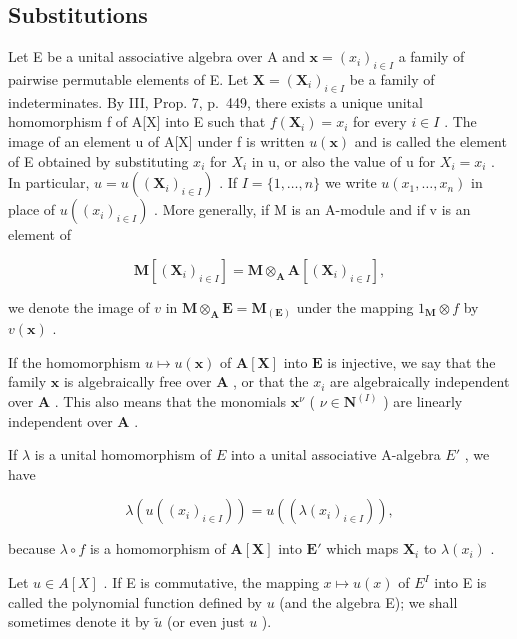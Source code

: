 \subsection{Substitutions}

Let E be a unital associative algebra over A and \(\mathbf{x} = (x_{i})_{i \in I}\) a family of pairwise permutable elements of E. Let \(\mathbf{X} = (\mathbf{X}_{i})_{i \in I}\) be a family of indeterminates. By III, Prop. 7, p.~449, there exists a unique unital homomorphism f of A{[}X{]} into E such that \(f(\mathbf{X}_{i}) = x_{i}\) for every \(i \in I\) . The image of an element u of A{[}X{]} under f is written \(u(\mathbf{x})\) and is called the element of E obtained by substituting \(x_{i}\) for \(X_{i}\) in u, or also the value of u for \(X_{i} = x_{i}\) . In particular, \(u = u((\mathbf{X}_{i})_{i \in I})\) . If \(I = \{1, \ldots, n\}\) we write \(u(x_{1}, \ldots, x_{n})\) in place of \(u((x_{i})_{i \in I})\) . More generally, if M is an A-module and if v is an element of

\[
\mathbf {M} [ (\mathbf {X} _ {i}) _ {i \in I} ] = \mathbf {M} \otimes_ {\mathbf {A}} \mathbf {A} [ (\mathbf {X} _ {i}) _ {i \in I} ],
\]

we denote the image of \(v\) in \(\mathbf{M} \otimes_{\mathbf{A}} \mathbf{E} = \mathbf{M}_{(\mathbf{E})}\) under the mapping \(1_{\mathbf{M}} \otimes f\) by \(v(\mathbf{x})\) .

If the homomorphism \(u \mapsto u(\mathbf{x})\) of \(\mathbf{A}[\mathbf{X}]\) into \(\mathbf{E}\) is injective, we say that the family \(\mathbf{x}\) is algebraically free over \(\mathbf{A}\) , or that the \(x_i\) are algebraically independent over \(\mathbf{A}\) . This also means that the monomials \(\mathbf{x}^\nu\) ( \(\nu \in \mathbf{N}^{(I)}\) ) are linearly independent over \(\mathbf{A}\) .

If \(\lambda\) is a unital homomorphism of \(E\) into a unital associative A-algebra \(E'\) , we have

\[
\lambda \left(u \left(\left(x _ {i}\right) _ {i \in I}\right)\right) = u \left(\left(\lambda \left(x _ {i}\right) _ {i \in I}\right)\right),\tag{1}
\]

because \(\lambda \circ f\) is a homomorphism of \(\mathbf{A}[\mathbf{X}]\) into \(\mathbf{E}'\) which maps \(\mathbf{X}_i\) to \(\lambda(x_i)\) .

Let \(u \in A[X]\) . If E is commutative, the mapping \(x \mapsto u(x)\) of \(E^{I}\) into E is called the polynomial function defined by \(u\) (and the algebra E); we shall sometimes denote it by \(\tilde{u}\) (or even just \(u\) ).

